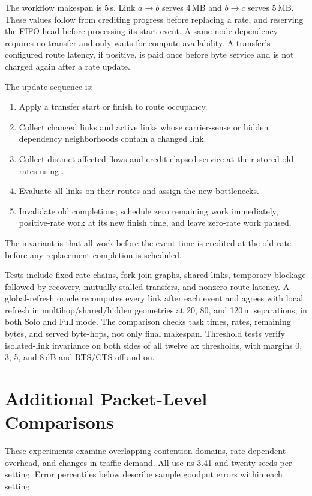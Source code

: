 The workflow makespan is 5\,s. Link $a\to b$ serves 4\,MB and $b\to c$
serves 5\,MB. These values follow from crediting progress before replacing
a rate, and reserving the FIFO head before processing its start event.
A same-node dependency requires no transfer and only waits for compute
availability. A transfer's configured route latency, if positive, is paid
once before byte service and is not charged again after a rate update.

The update sequence is:
\begin{enumerate}[itemsep=1pt,leftmargin=*]
\item Apply a transfer start or finish to route occupancy.
\item Collect changed links and active links whose carrier-sense or hidden
      dependency neighborhoods contain a changed link.
\item Collect distinct affected flows and credit elapsed service at their
      stored old rates using .
\item Evaluate all links on their routes and assign the new bottlenecks.
\item Invalidate old completions; schedule zero remaining work immediately,
      positive-rate work at its new finish time, and leave zero-rate work paused.
\end{enumerate}
The invariant is that all work before the event time is credited at the
old rate before any replacement completion is scheduled.

Tests include fixed-rate chains, fork-join graphs, shared links, temporary
blockage followed by recovery, mutually stalled transfers, and nonzero
route latency. A global-refresh oracle recomputes every link after each
event and agrees with local refresh in multihop/shared/hidden geometries
at 20, 80, and 120\,m separations, in both Solo and Full mode.
The comparison checks task times, rates, remaining bytes, and served
byte-hops, not only final makespan. Threshold tests verify isolated-link
invariance on both sides of all twelve ax thresholds, with margins
0, 3, 5, and 8\,dB and RTS/CTS off and on.

\section{Additional Packet-Level Comparisons}
\label{app:packet}

These experiments examine overlapping contention domains, rate-dependent
overhead, and changes in traffic demand.
All use ns-3.41 and twenty seeds per setting.
Error percentiles below describe sample goodput errors within each setting.


